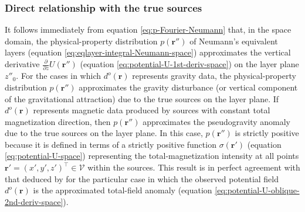\subsubsection{Direct relationship with the true sources}

It follows immediately from equation \ref{eq:p-Fourier-Neumann} that, in the space domain, the physical-property 
distribution $p(\mathbf{r}'')$ of Neumann's equivalent layers (equation \ref{eq:eqlayer-integral-Neumann-space})
approximates the vertical derivative
$\tfrac{\partial}{\partial z} U(\mathbf{r}'')$ (equation \ref{eq:potential-U-1st-deriv-space}) on the 
layer plane $z''_{0}$.
For the cases in which $d^{o}(\mathbf{r})$ represents gravity data, the physical-property 
distribution $p(\mathbf{r}'')$ approximates the gravity disturbance (or vertical component of the gravitational
attraction) due to the true sources on the layer plane.
If $d^{o}(\mathbf{r})$ represents magnetic data produced by sources with constant total magnetization direction, 
then $p(\mathbf{r}'')$ approximates the pseudogravity 
anomaly \citep[][ p. 345]{blakely1996} due to the true sources on the layer plane.
In this case, $p(\mathbf{r}'')$ is strictly positive because it is defined in terms of a strictly positive 
function $\sigma(\mathbf{r}')$ (equation \ref{eq:potential-U-space}) representing the 
total-magnetization intensity at all points $\mathbf{r}' = (x', y', z')^{\top} \in \mathcal{V}$ 
within the sources.
This result is in perfect agreement with that deduced by \citet{reis_etal2020} for
the particular case in which the observed potential field $d^{o}(\mathbf{r})$ is
the approximated total-field anomaly (equation \ref{eq:potential-U-oblique-2nd-deriv-space}).

